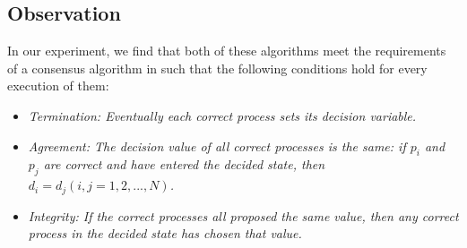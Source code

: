 \documentclass[dareport.tex]{subfiles}
\begin{document}
\subsection{Observation}

In our experiment, we find that both of these algorithms meet the requirements of a consensus algorithm\cite{coulouris} in such that the following conditions hold for every execution of them:
\begin{itemize}
\item \emph{Termination: Eventually each correct process sets its decision variable.}
\item \emph{Agreement: The decision value of all correct processes is the same: if $p_{i}$ and $p_{j}$ are correct and have entered the decided state, then $d_{i} = d_{j}   (i,j = 1,2,...,N)$.}
\item \emph{Integrity: If the correct processes all proposed the same value, then any correct process in the decided state has chosen that value.}

\end{itemize}
\end{document}
